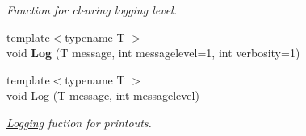 \begin{DoxyCompactItemize}
\begin{DoxyCompactList}\small\item\em Function for clearing logging level. \end{DoxyCompactList}\item 
\hypertarget{classTool_a46f7e599888302feefcf25e4f6cb4f9e}{{\footnotesize template$<$typename T $>$ }\\void {\bfseries Log} (T message, int messagelevel=1, int verbosity=1)}\label{classTool_a46f7e599888302feefcf25e4f6cb4f9e}

\item 
{\footnotesize template$<$typename T $>$ }\\void \hyperlink{classTool_ac65a2dfa2e3531fe8e05fe4112846fcf}{Log} (T message, int messagelevel)
\begin{DoxyCompactList}\small\item\em \hyperlink{classLogging}{Logging} fuction for printouts. \end{DoxyCompactList}\end{DoxyCompactItemize}
